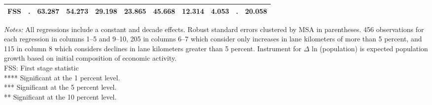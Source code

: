 \begin{table}[htbp]
\begin{tabular}{l*{10}{c}}
FSS                 &           .         &      63.287         &      54.273         &      29.198         &      23.865         &      45.668         &      12.314         &       4.053         &           .         &      20.058         \\
\hline\hline
\end{tabular}
\begin{flushleft}
\emph{Notes:} All regressions include a constant and decade effects. Robust standard errors clustered by MSA in parentheses. 456 observations for each regression in columns 1–5 and 9–10, 205 in columns 6–7 which consider only increases in lane kilometers of more than 5 percent, and 115 in column 8 which considers declines in lane kilometers greater than 5 percent. Instrument for $\Delta$ ln (population) is expected population growth based on initial composition of economic activity. \\ FSS: First stage statistic \\         **** Significant at the 1 percent level. \\    *** Significant at the 5 percent level. \\         ** Significant at the 10 percent level.
\end{flushleft}
\end{table}
